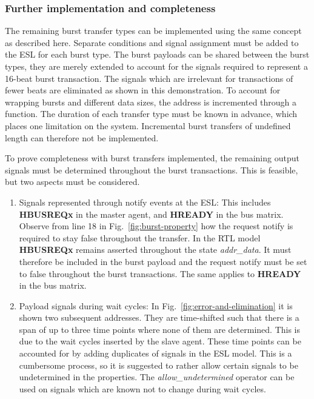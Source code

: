 \subsubsection{Further implementation and completeness}
The remaining burst transfer types can be implemented using the same concept as described here. Separate conditions and signal assignment must be added to the ESL for each burst type. The burst payloads can be shared between the burst types, they are merely extended to account for the signals required to represent a 16-beat burst transaction. The signals which are irrelevant for transactions of fewer beats are eliminated as shown in this demonstration. To account for wrapping bursts and different data sizes, the address is incremented through a function. The duration of each transfer type must be known in advance, which places one limitation on the system. Incremental burst transfers of undefined length can therefore not be implemented. \par
To prove completeness with burst transfers implemented, the remaining output signals must be determined throughout the burst transactions. This is feasible, but two aspects must be considered. 
\begin{enumerate}
 \item Signals represented through notify events at the ESL: This includes \textbf{HBUSREQx} in the master agent, and \textbf{HREADY} in the bus matrix. Observe from line 18 in Fig.~\ref{fig:burst-property} how the request notify is required to stay false throughout the transfer. In the RTL model \textbf{HBUSREQx} remains asserted throughout the state \textit{addr\_data}. It must therefore be included in the burst payload and the request notify must be set to false throughout the burst transactions. The same applies to \textbf{HREADY} in the bus matrix.
 \item Payload signals during wait cycles: In Fig.~\ref{fig:error-and-elimination} it is shown two subsequent addresses. They are time-shifted such that there is a span of up to three time points where none of them are determined. This is due to the wait cycles inserted by the slave agent. These time points can be accounted for by adding duplicates of signals in the ESL model. This is a cumbersome process, so it is suggested to rather allow certain signals to be undetermined in the properties. The \textit{allow\_undetermined} operator can be used on signals which are known not to change during wait cycles. 
\end{enumerate}

